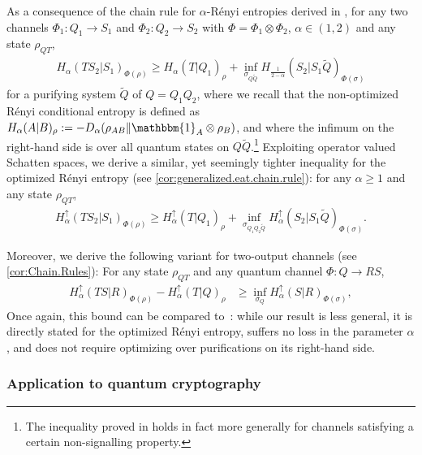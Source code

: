 \documentclass[11pt]{article}
\newcommand{\jk}[1]{\textcolor{cyan}{JK:~#1}}
\newcommand{\1}{\ensuremath{\mathbbm{1}}}
\theoremstyle{newdefinition}
\theoremstyle{newplain}
\theoremstyle{myplain}
\begin{document}
As a consequence of the chain rule for $\alpha$-R\'{e}nyi entropies derived in \cite[Lemma 3.6]{Metger.2024}, for any two channels $\Phi_1:Q_1\to S_1 $ and $\Phi_2:Q_2\to S_2$ with $\Phi=\Phi_1\otimes\Phi_2$, $\alpha\in(1,2)$ and any state $\rho_{QT}$,
\begin{align}
H_\alpha(TS_2|S_1)_{\Phi(\rho)}\ge H_\alpha(T|Q_1)_\rho+\inf_{\sigma_{Q\tilde{Q}}}H_{\frac{1}{2-\alpha}}(S_2|S_1\tilde{Q})_{\Phi(\sigma)}
\end{align}
for a purifying system $\tilde{Q}$ of $Q=Q_1Q_2$, where we recall that the non-optimized R\'{e}nyi conditional entropy is defined as $H_\alpha(A|B)_\rho:=-D_\alpha(\rho_{AB}\|\1_A\otimes \rho_B)$, and where the infimum on the right-hand side is over all quantum states on $Q\tilde{Q}$.\footnote{The inequality proved in \cite{Metger.2024} holds in fact more generally for channels satisfying a certain non-signalling property.} Exploiting operator valued Schatten spaces, we derive a similar, yet seemingly tighter inequality for the optimized R\'{e}nyi entropy (see \cref{cor:generalized.eat.chain.rule}): for any $\alpha\ge 1$ and any state $\rho_{QT}$,
\begin{align}\label{eq:intro.generalized.EAT}
H^\uparrow_\alpha(TS_2|S_1)_{\Phi(\rho)}\ge H_\alpha^\uparrow(T|Q_1)_\rho+\inf_{\sigma_{Q_1Q_2\tilde{Q}}}H^\uparrow_\alpha(S_2|S_1\tilde{Q})_{\Phi(\sigma)}.
\end{align}

Moreover, 
we derive the following variant for two-output channels (see \cref{cor:Chain.Rules}): For any state $\rho_{QT}$ and any quantum channel $\Phi:Q\to RS$,
\begin{align}
\label{eq:chain.rule.intro}
H^{\uparrow}_\alpha(TS|R)_{\Phi 
(\rho)} - H^{\uparrow}_\alpha(T|Q)_\rho &\geq   \inf_{\sigma_Q} H^{\uparrow}_\alpha(S|R)_{\Phi(\sigma)},
\end{align} 
Once again, this bound can be compared to~\cite[Lemma 3.6]{Metger.2024}: while our result is less general, it is directly stated for the optimized R\'enyi entropy, suffers no loss in the parameter $\alpha$, and does not require optimizing over purifications on its right-hand side. 




\subsubsection{Application to quantum cryptography}
\end{document}
